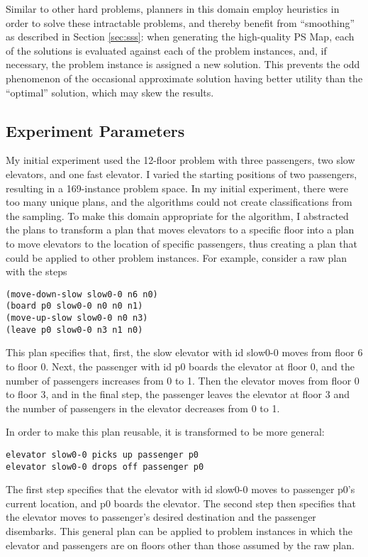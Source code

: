 Similar to other hard problems, planners in this domain employ heuristics in order to solve these intractable problems, and thereby benefit from ``smoothing'' as described in Section \ref{sec:sss}:  when generating the high-quality PS Map, each of the solutions is evaluated against each of the problem instances, and, if necessary, the problem instance is assigned a new solution.  This prevents the odd phenomenon of the occasional approximate solution having better utility than the ``optimal'' solution, which may skew the results.

\subsection{Experiment Parameters} My initial experiment used the 12-floor problem with three passengers, two slow elevators, and one fast elevator.  I varied the starting positions of two passengers, resulting in a 169-instance problem space.  In my initial experiment, there were too many unique plans, and the algorithms could not create classifications from the sampling. To make this domain appropriate for the algorithm, I abstracted the plans to transform a plan that moves elevators to a specific floor into a plan to move elevators to the location of specific passengers, thus creating a plan that could be applied to other problem instances.  For example, consider a raw plan with the steps

\begin{verbatim}
(move-down-slow slow0-0 n6 n0)
(board p0 slow0-0 n0 n0 n1)
(move-up-slow slow0-0 n0 n3)
(leave p0 slow0-0 n3 n1 n0)
\end{verbatim}

\noindent
This plan specifies that, first, the slow elevator with id slow0-0 moves from floor 6 to floor 0.  Next, the passenger with id p0 boards the elevator at floor 0, and the number of passengers increases from 0 to 1.  Then the elevator moves from floor 0 to floor 3, and in the final step, the passenger leaves the elevator at floor 3 and the number of passengers in the elevator decreases from 0 to 1.

In order to make this plan reusable, it is transformed to be  more general:

\begin{verbatim}
elevator slow0-0 picks up passenger p0
elevator slow0-0 drops off passenger p0
\end{verbatim}

The first step specifies that the elevator with id slow0-0 moves to passenger p0's current location, and p0 boards the elevator.  The second step then specifies that the elevator moves to passenger's desired destination and the passenger disembarks.  This general plan can  be applied to problem instances in which the elevator and passengers are on floors other than those assumed by the raw plan.

